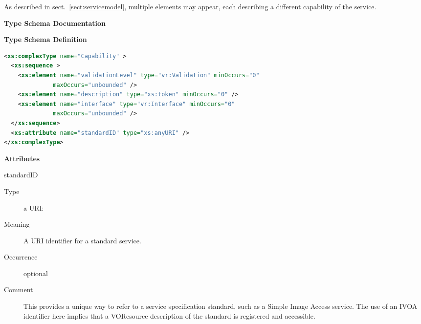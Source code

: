\documentclass[11pt,a4paper]{ivoa}
\begin{document}
\endgroup

As described in sect.~\ref{sect:servicemodel}, multiple
 elements may appear, each describing a
different capability of the service.  


\begingroup
      	\renewcommand*\descriptionlabel[1]{%
      	\hbox to 5.5em{\emph{#1}\hfil}}\vspace{2ex}\noindent\textbf{ Type Schema Documentation}


\vspace{1ex}\noindent\textbf{ Type Schema Definition}

\begin{lstlisting}[language=XML,basicstyle=\footnotesize]
<xs:complexType name="Capability" >
  <xs:sequence >
    <xs:element name="validationLevel" type="vr:Validation" minOccurs="0"
              maxOccurs="unbounded" />
    <xs:element name="description" type="xs:token" minOccurs="0" />
    <xs:element name="interface" type="vr:Interface" minOccurs="0"
              maxOccurs="unbounded" />
  </xs:sequence>
  <xs:attribute name="standardID" type="xs:anyURI" />
</xs:complexType>
\end{lstlisting}

\vspace{0.5ex}\noindent\textbf{ Attributes}

\begingroup\small\begin{bigdescription}
\item[standardID]
\begin{description}
\item[Type] a URI: 
\item[Meaning] 
               A URI identifier for a standard service. 
            
\item[Occurrence] optional
\item[Comment] 
               This provides a unique way to refer to a service
               specification standard, such as a Simple Image Access service.
               The use of an IVOA identifier here implies that a
               VOResource description of the standard is registered and 
               accessible.  
            
\end{description}


\end{bigdescription}\endgroup
\end{document}
